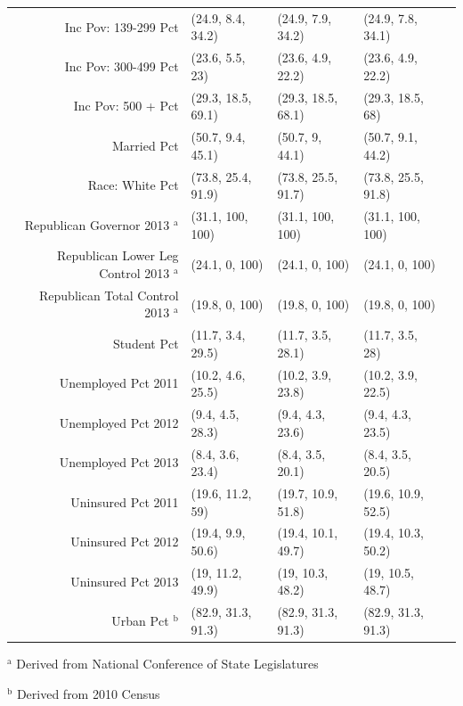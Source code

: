 \begin{table}[h!]
\begin{tabular}{rllll}
  Inc Pov: 139-299 Pct & (24.9, 8.4, 34.2) & (24.9, 7.9, 34.2) & (24.9, 7.8, 34.1) \\ 
  Inc Pov: 300-499 Pct & (23.6, 5.5, 23) & (23.6, 4.9, 22.2) & (23.6, 4.9, 22.2) \\ 
  Inc Pov: 500 + Pct & (29.3, 18.5, 69.1) & (29.3, 18.5, 68.1) & (29.3, 18.5, 68) \\ 
  Married Pct & (50.7, 9.4, 45.1) & (50.7, 9, 44.1) & (50.7, 9.1, 44.2) \\ 
  Race: White Pct & (73.8, 25.4, 91.9) & (73.8, 25.5, 91.7) & (73.8, 25.5, 91.8) \\ 
  Republican Governor 2013 $^\textrm{a}$& (31.1, 100, 100) & (31.1, 100, 100) & (31.1, 100, 100) \\ 
  Republican Lower Leg Control 2013 $^\textrm{a}$ & (24.1, 0, 100) & (24.1, 0, 100) & (24.1, 0, 100) \\ 
  Republican Total Control 2013 $^\textrm{a}$ & (19.8, 0, 100) & (19.8, 0, 100) & (19.8, 0, 100) \\ 
Student Pct & (11.7, 3.4, 29.5) & (11.7, 3.5, 28.1) & (11.7, 3.5, 28) \\ 
  Unemployed Pct 2011 & (10.2, 4.6, 25.5) & (10.2, 3.9, 23.8) & (10.2, 3.9, 22.5) \\ 
  Unemployed Pct 2012 & (9.4, 4.5, 28.3) & (9.4, 4.3, 23.6) & (9.4, 4.3, 23.5) \\ 
  Unemployed Pct 2013 & (8.4, 3.6, 23.4) & (8.4, 3.5, 20.1) & (8.4, 3.5, 20.5) \\ 
  Uninsured Pct 2011 & (19.6, 11.2, 59) & (19.7, 10.9, 51.8) & (19.6, 10.9, 52.5) \\ 
  Uninsured Pct 2012 & (19.4, 9.9, 50.6) & (19.4, 10.1, 49.7) & (19.4, 10.3, 50.2) \\ 
  Uninsured Pct 2013 & (19, 11.2, 49.9) & (19, 10.3, 48.2) & (19, 10.5, 48.7) \\ 
  Urban Pct $^\textrm{b}$ & (82.9, 31.3, 91.3) & (82.9, 31.3, 91.3) & (82.9, 31.3, 91.3) \\ 
   \hline
\end{tabular}
     \vspace{1ex}
     
     {\raggedright $^\textrm{a}$ Derived from National Conference of State Legislatures \par
     $^\textrm{b}$ Derived from 2010 Census \par
     }
\end{table}

